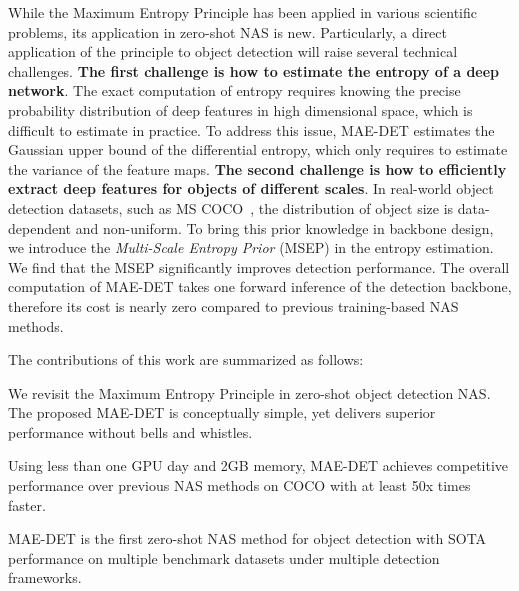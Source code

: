 \documentclass[nohyperref]{article}
\theoremstyle{plain}
\theoremstyle{definition}
\theoremstyle{remark}
\begin{document}
While the Maximum Entropy Principle has been applied in various scientific problems, its application in zero-shot NAS is new. Particularly, a direct application of the principle to object detection will raise several technical challenges. \textbf{The first challenge is how to estimate the entropy of a deep network}. The exact computation of entropy requires knowing the precise probability distribution of deep features in high dimensional space, which is difficult to estimate in practice. To address this issue, MAE-DET estimates the Gaussian upper bound of the differential entropy, which only requires to estimate the variance of the feature maps. \textbf{The second challenge is how to efficiently extract deep features for objects of different scales}. In real-world object detection datasets, such as MS COCO~\citep{coco}, the distribution of object size is data-dependent and non-uniform. To bring this prior knowledge in backbone design, we introduce the \textit{Multi-Scale Entropy Prior} (MSEP) in the entropy estimation. We find that the MSEP significantly improves detection performance. The overall computation of MAE-DET takes one forward inference of the detection backbone, therefore its cost is nearly zero compared to previous training-based NAS methods.


The contributions of this work are summarized as follows:
\begin{compactitem}
\item[] We revisit the Maximum Entropy Principle in zero-shot object detection NAS. The proposed MAE-DET is conceptually simple, yet delivers superior performance without bells and whistles.
\item[] Using less than one GPU day and 2GB memory, MAE-DET achieves competitive performance over previous NAS methods on COCO with at least 50x times faster.
\item[] MAE-DET is the first zero-shot NAS method for object detection with SOTA performance on multiple benchmark datasets under multiple detection frameworks. 
\end{compactitem}
\end{document}
